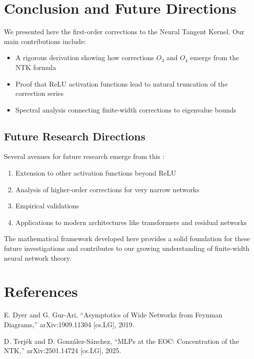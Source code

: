 \documentclass[11pt,a4paper]{article}
\theoremstyle{definition}
\begin{document}
\newpage

\section{Conclusion and Future Directions}

We presented here the first-order corrections to the Neural Tangent Kernel. Our main contributions include:

\begin{itemize}
\item A rigorous derivation showing how corrections $O_3$ and $O_4$ emerge from the NTK formula
\item Proof that ReLU activation functions lead to natural truncation of the correction series
\item Spectral analysis connecting finite-width corrections to eigenvalue bounds
\end{itemize}

\subsection{Future Research Directions}

Several avenues for future research emerge from this :

\begin{enumerate}
\item Extension to other activation functions beyond ReLU
\item Analysis of higher-order corrections for very narrow networks
\item Empirical validations
\item Applications to modern architectures like transformers and residual networks
\end{enumerate}

The mathematical framework developed here provides a solid foundation for these future investigations and contributes to our growing understanding of finite-width neural network theory.

\newpage




\appendix
\section{References}

E. Dyer and G. Gur-Ari,
``Asymptotics of Wide Networks from Feynman Diagrams,''
arXiv:1909.11304 [cs.LG], 2019.

D. Terjék and D. González-Sánchez,
``MLPs at the EOC: Concentration of the NTK,''
arXiv:2501.14724 [cs.LG], 2025.
\end{document}
